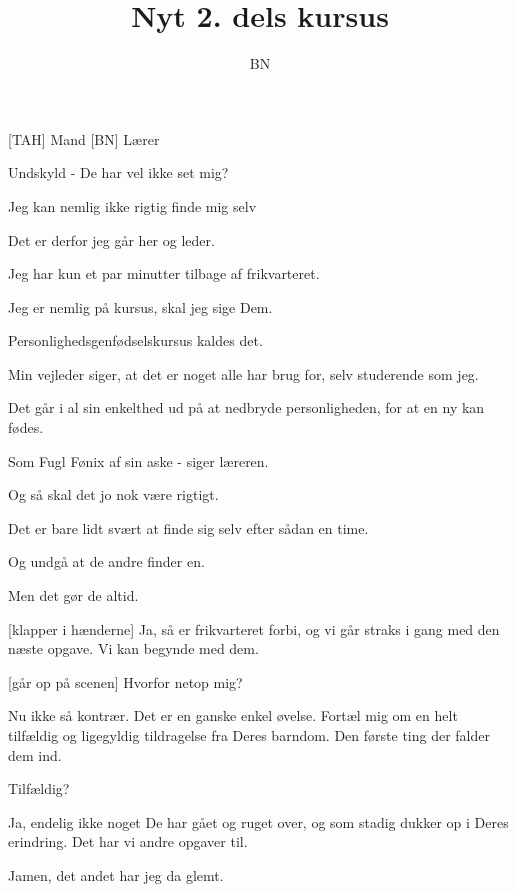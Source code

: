 \documentclass[a4paper,11pt]{article}
\title{Nyt 2. dels kursus}
\author{BN}
\begin{document}
\maketitle

\begin{roles}
  [TAH] Mand
  [BN] Lærer
\end{roles}

\begin{sketch}


   Undskyld - De har vel ikke set mig?

  Jeg kan nemlig ikke rigtig finde mig selv

  Det er derfor jeg går her og leder.

  Jeg har kun et par minutter tilbage af frikvarteret.

  Jeg er nemlig på kursus, skal jeg sige Dem.

  Personlighedsgenfødselskursus kaldes det.

  Min vejleder siger, at det er noget alle har brug for, selv studerende
  som jeg.

  Det går i al sin enkelthed ud på at nedbryde personligheden, for at en
  ny kan fødes.

  Som Fugl Fønix af sin aske - siger læreren.

  Og så skal det jo nok være rigtigt.

  Det er bare lidt svært at finde sig selv efter sådan en time.

  Og undgå at de andre finder en.

  Men det gør de altid.


  [klapper i hænderne] Ja, så er frikvarteret forbi, og vi går
  straks i gang med den næste opgave.  Vi kan begynde med dem.

[går op på scenen]  Hvorfor netop mig?

 Nu ikke så kontrær.  Det er en ganske enkel øvelse.  Fortæl
mig om en helt tilfældig og ligegyldig tildragelse fra Deres barndom.
Den første ting der falder dem ind.

 Tilfældig?

 Ja, endelig ikke noget De har gået og ruget over, og som
stadig dukker op i Deres erindring.  Det har vi andre opgaver til.

 Jamen, det andet har jeg da glemt.


\end{sketch}
\end{document}
